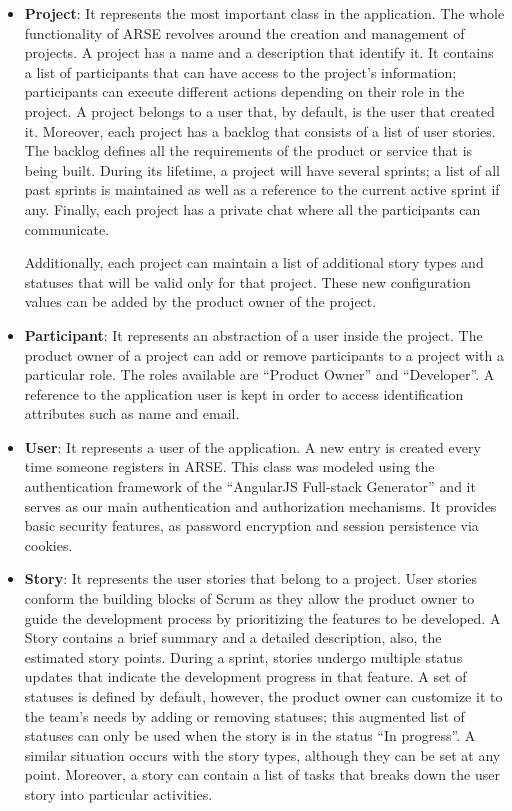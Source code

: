 \documentclass[
	accentcolor=tud1a %
]{tudreport}
\begin{document}
\begin{itemize}

\item \textbf{Project}: It represents the most important class in the application. The whole functionality of ARSE revolves around the creation and management of projects. A project has a name and a description that identify it. It contains a list of participants that can have access to the project's information; participants can execute different actions depending on their role in the project. A project belongs to a user that, by default, is the user that created it. Moreover, each project has a backlog that consists of a list of user stories. The backlog defines all the requirements of the product or service that is being built. During its lifetime, a project will have several sprints; a list of all past sprints is maintained as well as a reference to the current active sprint if any. Finally, each project has a private chat where all the participants can communicate.

Additionally, each project can maintain a list of additional story types and statuses that will be valid only for that project. These new configuration values can be added by the product owner of the project.

\item \textbf{Participant}: It represents an abstraction of a user inside the project. The product owner of a project can add or remove participants to a project with a particular role. The roles available are ``Product Owner'' and ``Developer''. A reference to the application user is kept in order to access identification attributes such as name and email.

\item \textbf{User}: It represents a user of the application. A new entry is created every time someone registers in ARSE. This class was modeled using the authentication framework of the ``AngularJS Full-stack Generator'' \cite{AFSG} and it serves as our main authentication and authorization mechanisms. It provides basic security features, as password encryption and session persistence via cookies.  

\item \textbf{Story}: It represents the user stories that belong to a project. User stories conform the building blocks of Scrum as they allow the product owner to guide the development process by prioritizing the features to be developed. A Story contains a brief summary and a detailed description, also, the estimated story points. During a sprint, stories undergo multiple status updates that indicate the development progress in that feature. A set of statuses is defined by default, however, the product owner can customize it to the team's needs by adding or removing statuses; this augmented list of statuses can only be used when the story is in the status ``In progress''. A similar situation occurs with the story types, although they can be set at any point. Moreover, a story can contain a list of tasks that breaks down the user story into particular activities. 


\end{itemize}
\end{document}
